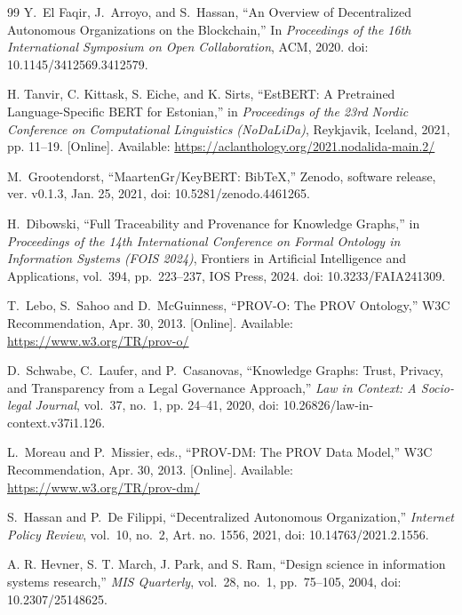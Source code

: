 \documentclass[journal]{IEEEtran}
\begin{document}
\begin{thebibliography}{99}
Y.~El Faqir, J.~Arroyo, and S.~Hassan,
``An Overview of Decentralized Autonomous Organizations
on the Blockchain,''
In \emph{Proceedings of the 16th International Symposium
on Open Collaboration}, ACM, 2020.
doi: 10.1145/3412569.3412579.

H. Tanvir, C. Kittask, S. Eiche, and K. Sirts,
``EstBERT: A Pretrained Language-Specific BERT for Estonian,''
in \emph{Proceedings of the 23rd Nordic Conference on Computational Linguistics (NoDaLiDa)},
Reykjavik, Iceland, 2021, pp. 11--19. [Online]. Available:
\url{https://aclanthology.org/2021.nodalida-main.2/}

M.~Grootendorst,
``MaartenGr/KeyBERT: BibTeX,''
Zenodo, software release, ver. v0.1.3, Jan. 25, 2021,
doi: 10.5281/zenodo.4461265.

H.~Dibowski,
``Full Traceability and Provenance for Knowledge Graphs,''
in \emph{Proceedings of the 14th International Conference on
Formal Ontology in Information Systems (FOIS 2024)},
Frontiers in Artificial Intelligence and Applications,
vol.~394, pp.~223--237,
IOS Press, 2024.
doi: 10.3233/FAIA241309.

T.~Lebo, S.~Sahoo and D.~McGuinness,
``PROV-O: The PROV Ontology,''
W3C Recommendation, Apr. 30, 2013. [Online]. Available:
\url{https://www.w3.org/TR/prov-o/}

D.~Schwabe, C.~Laufer, and P.~Casanovas,
``Knowledge Graphs: Trust, Privacy, and Transparency
from a Legal Governance Approach,''
\emph{Law in Context: A Socio-legal Journal},
vol.~37, no.~1, pp. 24--41, 2020,
doi: 10.26826/law-in-context.v37i1.126.

L.~Moreau and P.~Missier, eds.,
``PROV-DM: The PROV Data Model,''
W3C Recommendation, Apr. 30, 2013. [Online]. Available:
\url{https://www.w3.org/TR/prov-dm/}

S.~Hassan and P.~De Filippi,
``Decentralized Autonomous Organization,''
\emph{Internet Policy Review},
vol.~10, no.~2, Art. no. 1556, 2021,
doi: 10.14763/2021.2.1556.

A. R. Hevner, S. T. March, J. Park, and S. Ram,
``Design science in information systems research,''
\textit{MIS Quarterly}, vol.~28, no.~1, pp.~75--105, 2004, doi: 10.2307/25148625.

\end{thebibliography}

\end{document}

